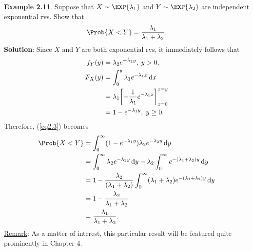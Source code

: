 \begin{Example}
    \textbf{Example 2.11}. Suppose that $ X \sim \EXP{\lambda_1} $ and $ Y \sim \EXP{\lambda_2} $ are independent exponential rvs. Show that
    \[ \Prob{X<Y}=\frac{\lambda_1}{\lambda_1+\lambda_2}.  \]
    \tcblower{}
    \textbf{Solution}: Since $ X $ and $ Y $ are both exponential rvs, it immediately follows that
    \begin{align*}
        f_Y(y) & =\lambda_2 e^{-\lambda_2 y},\; y>0,                                     \\
        F_X(y) & =\int_{0}^{y}\lambda_1 e^{-\lambda_1 x}\odif{x}                         \\
               & =\lambda_1\biggl[-\frac{1}{\lambda_1}e^{-\lambda_1x}\biggr]_{x=0}^{x=y} \\
               & =1-e^{-\lambda_1 y},\; y\ge 0.
    \end{align*}
    Therefore, (\ref{eq2.3}) becomes
    \begin{align*}
        \Prob{X<Y}
         & =\int_{0}^{\infty}(1-e^{-\lambda_1y})\lambda_2 e^{-\lambda_2 y}\odif{y}                                              \\
         & =\int_{0}^{\infty}\lambda_2 e^{-\lambda_2 y}\odif{y} -\lambda_2 \int_{0}^{\infty}e^{-(\lambda_1+\lambda_2)y}\odif{y} \\
         & =1-\frac{\lambda_2}{(\lambda_1+\lambda_2)} \int_{0}^{\infty}(\lambda_1+\lambda_2)e^{-(\lambda_1+\lambda_2)y}\odif{y} \\
         & =1-\frac{\lambda_2}{\lambda_1+\lambda_2}                                                                             \\
         & =\frac{\lambda_1}{\lambda_1+\lambda_2}.
    \end{align*}
    \underline{Remark}: As a matter of interest, this particular result will be featured quite prominently in
    Chapter 4.
\end{Example}
